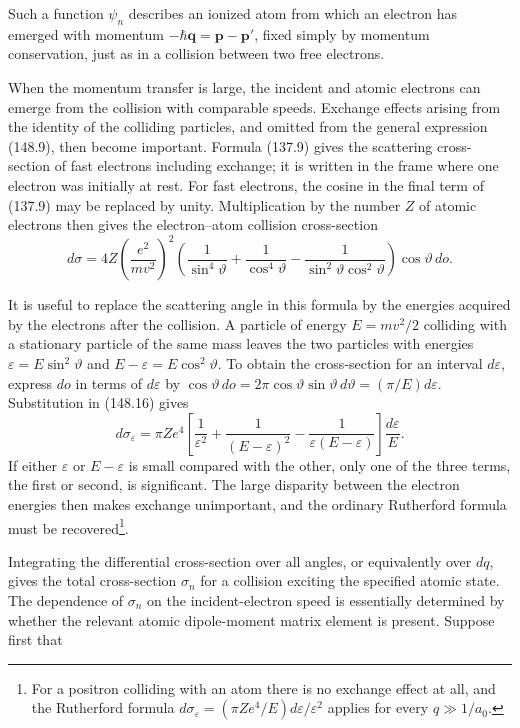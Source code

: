 Such a function $\psi_n$ describes an ionized atom from which an electron has emerged with momentum $-\hbar\mathbf q=\mathbf p-\mathbf p'$, fixed simply by momentum conservation, just as in a collision between two free electrons.

When the momentum transfer is large, the incident and atomic electrons can emerge from the collision with comparable speeds. Exchange effects arising from the identity of the colliding particles, and omitted from the general expression (148.9), then become important. Formula (137.9) gives the scattering cross-section of fast electrons including exchange; it is written in the frame where one electron was initially at rest. For fast electrons, the cosine in the final term of (137.9) may be replaced by unity. Multiplication by the number $Z$ of atomic electrons then gives the electron--atom collision cross-section
\begin{equation}
 d\sigma=4Z\left(\frac{e^2}{mv^2}\right)^2
 \left(\frac1{\sin^4\vartheta}+\frac1{\cos^4\vartheta}
 -\frac1{\sin^2\vartheta\cos^2\vartheta}\right)\cos\vartheta\,do.
 \tag{148.16}
\end{equation}

It is useful to replace the scattering angle in this formula by the energies acquired by the electrons after the collision. A particle of energy $E=mv^2/2$ colliding with a stationary particle of the same mass leaves the two particles with energies $\varepsilon=E\sin^2\vartheta$ and $E-\varepsilon=E\cos^2\vartheta$. To obtain the cross-section for an interval $d\varepsilon$, express $do$ in terms of $d\varepsilon$ by
$\cos\vartheta\,do=2\pi\cos\vartheta\sin\vartheta\,d\vartheta=(\pi/E)d\varepsilon$. Substitution in (148.16) gives
\begin{equation}
 d\sigma_\varepsilon=\pi Ze^4\left[\frac1{\varepsilon^2}+\frac1{(E-\varepsilon)^2}
 -\frac1{\varepsilon(E-\varepsilon)}\right]\frac{d\varepsilon}{E}.
 \tag{148.17}
\end{equation}
If either $\varepsilon$ or $E-\varepsilon$ is small compared with the other, only one of the three terms, the first or second, is significant. The large disparity between the electron energies then makes exchange unimportant, and the ordinary Rutherford formula must be recovered\footnote{For a positron colliding with an atom there is no exchange effect at all, and the Rutherford formula $d\sigma_\varepsilon=(\pi Ze^4/E)d\varepsilon/\varepsilon^2$ applies for every $q\gg1/a_0$.}.

Integrating the differential cross-section over all angles, or equivalently over $dq$, gives the total cross-section $\sigma_n$ for a collision exciting the specified atomic state. The dependence of $\sigma_n$ on the incident-electron speed is essentially determined by whether the relevant atomic dipole-moment matrix element is present. Suppose first that


